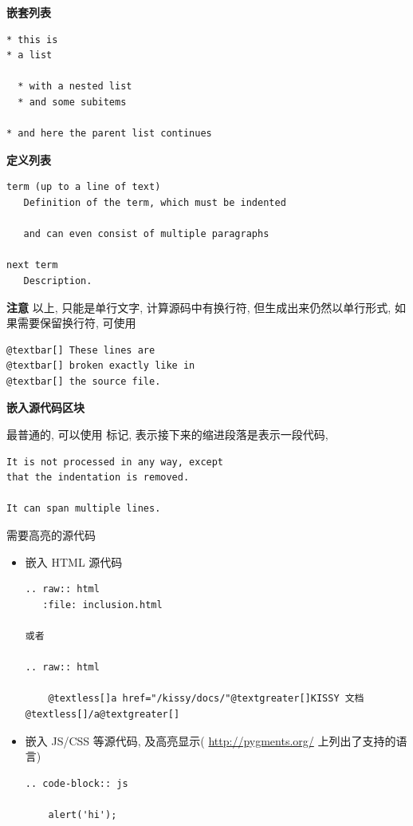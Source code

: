 \documentclass[letterpaper,10pt,english]{sphinxmanual}
\begin{document}
\textbf{嵌套列表}

\begin{Verbatim}[commandchars=@\[\]]
* this is
* a list

  * with a nested list
  * and some subitems

* and here the parent list continues
\end{Verbatim}

\textbf{定义列表}

\begin{Verbatim}[commandchars=@\[\]]
term (up to a line of text)
   Definition of the term, which must be indented

   and can even consist of multiple paragraphs

next term
   Description.
\end{Verbatim}

\textbf{注意} 以上, 只能是单行文字, 计算源码中有换行符, 但生成出来仍然以单行形式, 如果需要保留换行符, 可使用

\begin{Verbatim}[commandchars=@\[\]]
@textbar[] These lines are
@textbar[] broken exactly like in
@textbar[] the source file.
\end{Verbatim}

\textbf{嵌入源代码区块}

最普通的, 可以使用  \code{::} 标记, 表示接下来的缩进段落是表示一段代码,

\begin{Verbatim}[commandchars=@\[\]]
It is not processed in any way, except
that the indentation is removed.

It can span multiple lines.
\end{Verbatim}

需要高亮的源代码
\begin{itemize}
\item {}
嵌入 HTML 源代码

\begin{Verbatim}[commandchars=@\[\]]
.. raw:: html
   :file: inclusion.html

或者

.. raw:: html

    @textless[]a href="/kissy/docs/"@textgreater[]KISSY 文档@textless[]/a@textgreater[]
\end{Verbatim}

\item {}
嵌入 JS/CSS 等源代码, 及高亮显示( \href{http://pygments.org/}{http://pygments.org/} 上列出了支持的语言)

\begin{Verbatim}[commandchars=@\[\]]
.. code-block:: js

    alert('hi');
\end{Verbatim}

\end{itemize}
\end{document}
